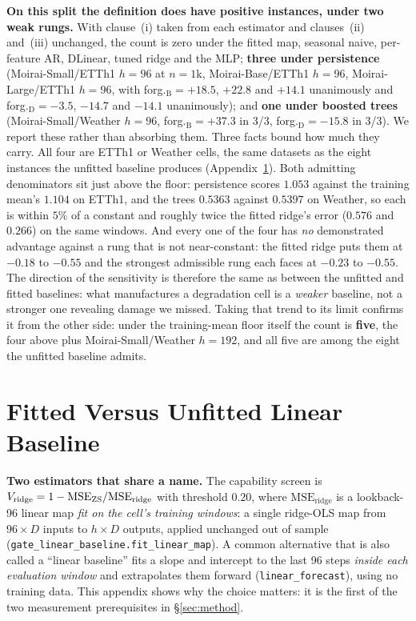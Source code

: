 \textbf{On this split the definition does have positive instances, under two
weak rungs.}  With clause~(i) taken from each estimator and clauses~(ii)
and~(iii) unchanged, the count is zero under the fitted map, seasonal naive,
per-feature AR, DLinear, tuned ridge and the MLP; \textbf{three under persistence}
(Moirai-Small/ETTh1 $h{=}96$ at $n{=}1$k, Moirai-Base/ETTh1 $h{=}96$,
Moirai-Large/ETTh1 $h{=}96$, with forg.$_\text{B}{=}{+}18.5$, $+22.8$ and $+14.1$
unanimously and forg.$_\text{D}{=}{-}3.5$, $-14.7$ and $-14.1$ unanimously); and
\textbf{one under boosted trees} (Moirai-Small/Weather $h{=}96$,
forg.$_\text{B}{=}{+}37.3$ in 3/3, forg.$_\text{D}{=}{-}15.8$ in 3/3).  We report
these rather than absorbing them.  Three facts bound how much they carry.  All
four are ETTh1 or Weather cells, the same datasets as the eight instances the
unfitted baseline produces (Appendix~\ref{app:gatecorrection}).  Both admitting denominators sit just above the floor: persistence
scores $1.053$ against the training mean's $1.104$ on ETTh1, and the trees $0.5363$
against $0.5397$ on Weather, so each is within $5\%$ of a constant and roughly
twice the fitted ridge's error ($0.576$ and $0.266$) on the same windows.  And
every one of the four has \emph{no} demonstrated advantage against a rung that is
not near-constant: the fitted ridge puts them at $-0.18$ to $-0.55$ and the
strongest admissible rung each faces at $-0.23$ to $-0.55$.  The direction of
the sensitivity is therefore the same as between the unfitted and fitted
baselines: what manufactures a
degradation cell is a \emph{weaker} baseline, not a stronger one revealing damage
we missed.  Taking that trend to its limit confirms it from the other side: under
the training-mean floor itself the count is \textbf{five}, the four above plus
Moirai-Small/Weather $h{=}192$, and all five are among the eight the unfitted
baseline admits.

\section{Fitted Versus Unfitted Linear Baseline}
\label{app:gatecorrection}

\textbf{Two estimators that share a name.}  The capability screen is
$V_{\text{ridge}} = 1 - \text{MSE}_\text{ZS}/\text{MSE}_\text{ridge}$ with
threshold $0.20$, where $\text{MSE}_\text{ridge}$ is a lookback-96 linear map
\emph{fit on the cell's training windows}: a single ridge-OLS map from
$96{\times}D$ inputs to $h{\times}D$ outputs, applied unchanged out of sample
(\texttt{gate\_linear\_baseline.fit\_linear\_map}).  A common alternative that is
also called a ``linear baseline'' fits a slope and intercept to the last 96 steps
\emph{inside each evaluation window} and extrapolates them forward
(\texttt{linear\_forecast}), using no training data.  This appendix shows why the
choice matters: it is the first of the two measurement prerequisites in
\S\ref{sec:method}.

